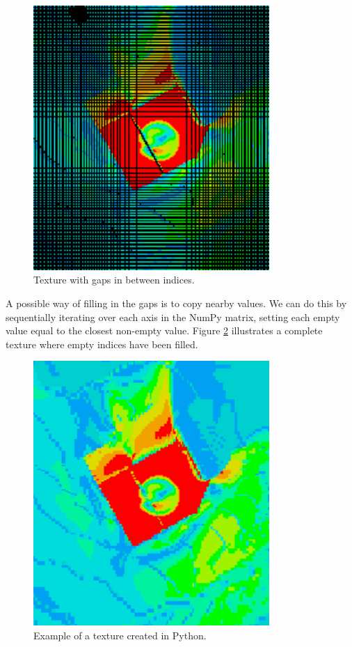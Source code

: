 \documentclass[a4paper,11pt]{extarticle}
\begin{document}
\begin{figure}[H]
  \centering
  \includegraphics[width=0.8\textwidth]{gfx/uneven_texture.png}
  \caption{Texture with gaps in between indices.}
  \label{fig:PythonTextureGaps}
\end{figure}

A possible way of filling in the gaps is to copy nearby values. We can do this by sequentially iterating over each axis in the NumPy matrix, setting each empty value equal to the closest non-empty value. Figure \ref{fig:PythonTexture} illustrates a complete texture where empty indices have been filled.

\begin{figure}[H]
  \centering
  \includegraphics[width=0.8\textwidth]{gfx/texture.png}
  \caption{Example of a texture created in Python.}
  \label{fig:PythonTexture}
\end{figure}
\end{document}
